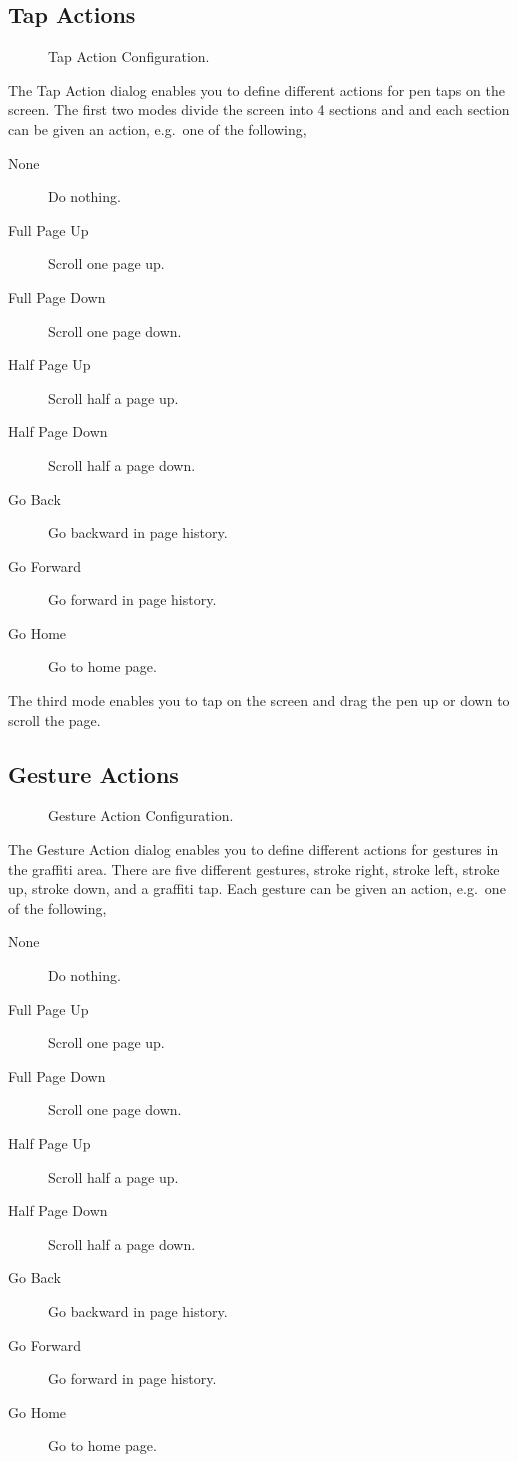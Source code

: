 \subsection{Tap Actions}\label{sec:TapAction}

\begin{figure} [!htb]
\centerline{}
\caption{\label{fig:TapAction}Tap Action Configuration.}
\end{figure}

The Tap Action dialog enables you to define different actions for pen
taps on the screen. The first two modes divide the screen into 4 sections
and and each section can be given an action, e.g.\ one of the following,

\begin{description}
  \item[None] Do nothing.
  \item[Full Page Up] Scroll one page up.
  \item[Full Page Down] Scroll one page down.
  \item[Half Page Up] Scroll half a page up.
  \item[Half Page Down] Scroll half a page down.
  \item[Go Back] Go backward in page history.
  \item[Go Forward] Go forward in page history.
  \item[Go Home] Go to home page.
\end{description}

The third mode enables you to tap on the screen and drag the pen up or
down to scroll the page.

\subsection{Gesture Actions}\label{sec:Gestures}

\begin{figure} [!htb]
\centerline{}
\caption{\label{fig:Gestures}Gesture Action Configuration.}
\end{figure}

The Gesture Action dialog enables you to define different actions for
gestures in the graffiti area. There are five different gestures, stroke
right, stroke left, stroke up, stroke down, and a graffiti tap. Each
gesture can be given an action, e.g.\ one of the following,

\begin{description}
  \item[None] Do nothing.
  \item[Full Page Up] Scroll one page up.
  \item[Full Page Down] Scroll one page down.
  \item[Half Page Up] Scroll half a page up.
  \item[Half Page Down] Scroll half a page down.
  \item[Go Back] Go backward in page history.
  \item[Go Forward] Go forward in page history.
  \item[Go Home] Go to home page.
\end{description}

